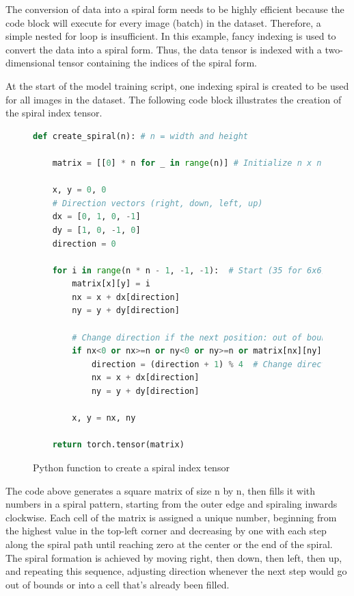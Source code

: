     The conversion of data into a spiral form needs to be highly efficient because the code block will execute for every image (batch) in the dataset. Therefore, a simple nested for loop is insufficient. In this example, fancy indexing is used to convert the data into a spiral form. Thus, the data tensor is indexed with a two-dimensional tensor containing the indices of the spiral form.

    At the start of the model training script, one indexing spiral is created to be used for all images in the dataset. The following code block illustrates the creation of the spiral index tensor.

\begin{figure}[H]
\centering
\begin{lstlisting}[language=Python]
def create_spiral(n): # n = width and height
    
    matrix = [[0] * n for _ in range(n)] # Initialize n x n matrix

    x, y = 0, 0
    # Direction vectors (right, down, left, up)
    dx = [0, 1, 0, -1]
    dy = [1, 0, -1, 0]
    direction = 0

    for i in range(n * n - 1, -1, -1):  # Start (35 for 6x6)
        matrix[x][y] = i
        nx = x + dx[direction]
        ny = y + dy[direction]

        # Change direction if the next position: out of bounds or filled
        if nx<0 or nx>=n or ny<0 or ny>=n or matrix[nx][ny]!=0:
            direction = (direction + 1) % 4  # Change direction
            nx = x + dx[direction]
            ny = y + dy[direction]

        x, y = nx, ny
    
    return torch.tensor(matrix)
\end{lstlisting}
\caption{Python function to create a spiral index tensor}
\label{fig:spiral_matrix}
\end{figure}

    The code above generates a square matrix of size n by n, then fills it with numbers in a spiral pattern, starting from the outer edge and spiraling inwards clockwise. Each cell of the matrix is assigned a unique number, beginning from the highest value in the top-left corner and decreasing by one with each step along the spiral path until reaching zero at the center or the end of the spiral. The spiral formation is achieved by moving right, then down, then left, then up, and repeating this sequence, adjusting direction whenever the next step would go out of bounds or into a cell that's already been filled.


